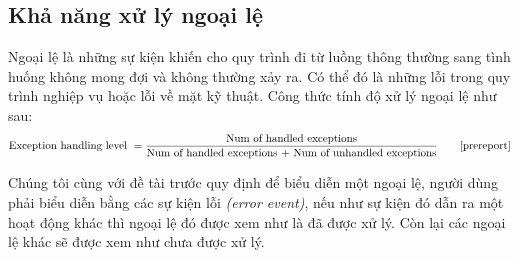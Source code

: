 \subsection{Khả năng xử lý ngoại lệ}
Ngoại lệ là những sự kiện khiến cho quy trình đi từ luồng thông thường sang tình huống không mong đợi và không thường xảy ra. Có thể đó là những lỗi trong quy trình nghiệp vụ hoặc lỗi về mặt kỹ thuật. Công thức tính độ xử lý ngoại lệ như sau:
\[ \text{Exception handling level } = \frac{\text{Num of handled exceptions}}{\text{Num of handled exceptions + Num of unhandled exceptions}} \tag*{\cite{prereport}}\]
\par
Chúng tôi cùng với đề tài trước quy định để biểu
diễn một ngoại lệ, người dùng phải biểu diễn bằng các sự kiện lỗi \emph{(error event)}, nếu như sự kiện đó dẫn ra một hoạt động khác thì ngoại lệ đó được xem như là đã được xử lý. Còn lại các ngoại lệ khác sẽ được xem như chưa được xử lý.